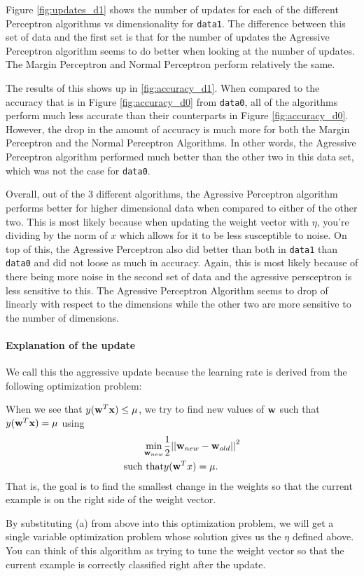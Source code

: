 \begin{enumerate}
Figure \ref{fig:updates_d1} shows the number of updates for each of the different
Perceptron algorithms vs dimensionality for \verb~data1~. The difference between
this set of data and the first set is that for the number of updates the Agressive
Perceptron algorithm seems to do better when looking at the number of updates.
The Margin Perceptron and Normal Perceptron perform relatively the same.

The results of this shows up in \ref{fig:accuracy_d1}. When compared to the accuracy
that is in Figure \ref{fig:accuracy_d0} from \verb~data0~, all of the algorithms
perform much less accurate than their counterparts in Figure \ref{fig:accuracy_d0}.
However, the drop in the amount of accuracy is much more for both the Margin Perceptron
and the Normal Perceptron Algorithms. In other words, the Agressive Perceptron algorithm
performed much better than the other two in this data set, which was not the case for
\verb~data0~.

Overall, out of the 3 different algorithms, the Agressive Perceptron algorithm
performs better for higher dimensional data when compared to either of the other two.
This is most likely because when updating the weight vector with $\eta$, you're dividing by the norm of $x$ which allows for it to be less susceptible to noise. On top of this, the Agressive
Perceptron also did better than both in \verb~data1~ than \verb~data0~ and did
not loose as much in accuracy. Again, this is most likely because of there being more noise in the second set of data and the agressive persceptron is less sensitive to this.
The Agressive Perceptron Algorithm seems to drop of linearly with respect to the dimensions
while the other two are more sensitive to the number of dimensions.


  \paragraph{Explanation of the update} We call this the aggressive
  update because the learning rate is derived from the following
  optimization problem:

  When we see that $y({\bf w}^T {\bf x}) \leq \mu$, we try to find new values
  of ${\bf w}$ such that $y({\bf w}^T {\bf x}) = \mu$ using
  \begin{eqnarray*}
    \min_{{\bf w}_{new}} &     \frac{1}{2} {||\textbf{${\bf w}_{new}$} - \textbf{${\bf w}_{old}$}||}^2\\
    \mbox{such that} & y({\bf w}^T x) = \mu.
  \end{eqnarray*}
  That is, the goal is to find the smallest change in the weights so
  that the current example is on the right side of the weight vector.

  By substituting (a) from above into this optimization problem, we
  will get a single variable optimization problem whose solution gives
  us the $\eta$ defined above. You can think of this algorithm as
  trying to tune the weight vector so that the current example is
  correctly classified right after the update.
\end{enumerate}


